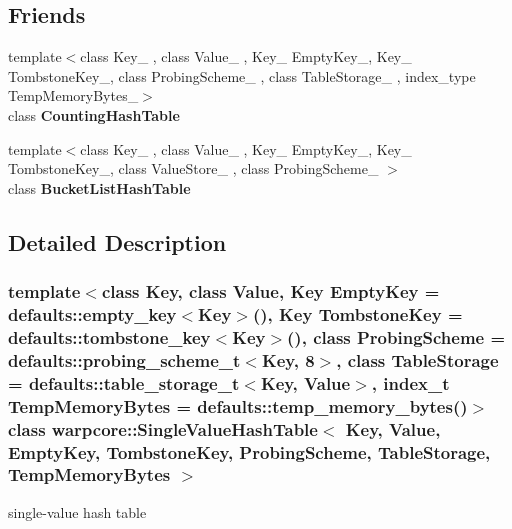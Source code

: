 \subsection*{Friends}
\begin{DoxyCompactItemize}
\item 
\mbox{\label{classwarpcore_1_1SingleValueHashTable_ab68c1d1cdf92eb5e200097df41bb83ab}} 
{\footnotesize template$<$class Key\+\_\+ , class Value\+\_\+ , Key\+\_\+ Empty\+Key\+\_\+, Key\+\_\+ Tombstone\+Key\+\_\+, class Probing\+Scheme\+\_\+ , class Table\+Storage\+\_\+ , index\+\_\+type Temp\+Memory\+Bytes\+\_\+$>$ }\\class {\bfseries Counting\+Hash\+Table}
\item 
\mbox{\label{classwarpcore_1_1SingleValueHashTable_a783d1e3ec6e71e58fd0996d3b580aa9a}} 
{\footnotesize template$<$class Key\+\_\+ , class Value\+\_\+ , Key\+\_\+ Empty\+Key\+\_\+, Key\+\_\+ Tombstone\+Key\+\_\+, class Value\+Store\+\_\+ , class Probing\+Scheme\+\_\+ $>$ }\\class {\bfseries Bucket\+List\+Hash\+Table}
\end{DoxyCompactItemize}


\subsection{Detailed Description}
\subsubsection*{template$<$class Key, class Value, Key Empty\+Key = defaults\+::empty\+\_\+key$<$\+Key$>$(), Key Tombstone\+Key = defaults\+::tombstone\+\_\+key$<$\+Key$>$(), class Probing\+Scheme = defaults\+::probing\+\_\+scheme\+\_\+t$<$\+Key, 8$>$, class Table\+Storage = defaults\+::table\+\_\+storage\+\_\+t$<$\+Key, Value$>$, index\+\_\+t Temp\+Memory\+Bytes = defaults\+::temp\+\_\+memory\+\_\+bytes()$>$\newline
class warpcore\+::\+Single\+Value\+Hash\+Table$<$ Key, Value, Empty\+Key, Tombstone\+Key, Probing\+Scheme, Table\+Storage, Temp\+Memory\+Bytes $>$}

single-\/value hash table 


